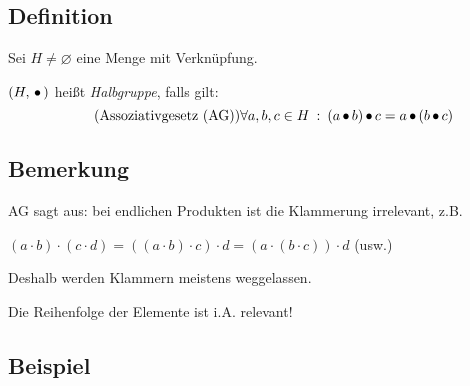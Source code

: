 \subsection[Definition: Halbgruppe]{Definition}

Sei $H \neq \varnothing$ eine Menge mit Verknüpfung.

$(H, \,{\bullet}\,)$ heißt \emph{Halbgruppe}, falls gilt:
\[ \tag{Assoziativgesetz (AG)}
\forall a, b, c \in H \::\: (a \,{\bullet}\, b) \,{\bullet}\, c = a \,{\bullet}\, (b \,{\bullet}\, c)
\]

\subsection{Bemerkung}

AG sagt aus: bei endlichen Produkten ist die Klammerung irrelevant, z.B.

$(a \cdot b) \cdot (c \cdot d) = ((a \cdot b) \cdot c) \cdot d = (a \cdot (b \cdot c)) \cdot d$ \:(usw.)

Deshalb werden Klammern meistens weggelassen.

Die Reihenfolge der Elemente ist i.A. relevant!

\subsection{Beispiel} \label{bspHalbgruppe}

